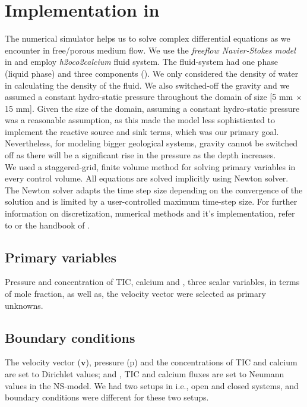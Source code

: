 \section{Implementation in \DuMuX}\label{ssec:impdum}
The numerical simulator \DuMuX helps us to solve complex differential equations as we encounter in free/porous medium flow. 
We use the \textit{freeflow Navier-Stokes model} in \DuMuX and employ \textit{h2oco2calcium} fluid system. 
The fluid-system had one phase (liquid phase) and three components (). We only considered the density 
of water in calculating the density of the fluid. We also switched-off the gravity and we assumed a constant hydro-static pressure 
throughout the domain of size [5 mm $\times$ 15 mm]. Given the size of the domain, assuming a constant hydro-static pressure was 
a reasonable assumption, as this made the model less sophisticated to implement the reactive source and sink terms, which was our 
primary goal. Nevertheless, for modeling bigger geological systems, gravity cannot be switched off as there 
will be a significant rise in the pressure as the depth increases.\\
We used a staggered-grid, finite volume method for solving primary variables in every control volume. 
All equations are solved implicitly using Newton solver. The Newton solver adapts 
the time step size depending on the convergence of the solution and is limited by a user-controlled maximum time-step size. 
For further information on discretization, numerical methods and it's implementation, refer to \cite{Koch2020} or the handbook 
of \DuMuX \cite{Kochetal2020Dumux}.

\subsection{Primary variables} Pressure and concentration  of TIC, calcium and , three scalar variables, in 
terms of mole fraction, as well as, the velocity vector were selected as primary unknowns. 

\subsection{Boundary conditions} 
The velocity vector ($\mathbf{v}$), pressure (p) and the concentrations of TIC and calcium are set to Dirichlet values; 
and , TIC and calcium fluxes are set to Neumann values in the NS-model. We had two setups in \DuMuX i.e., open 
and closed systems, and boundary conditions were different for these two setups.


